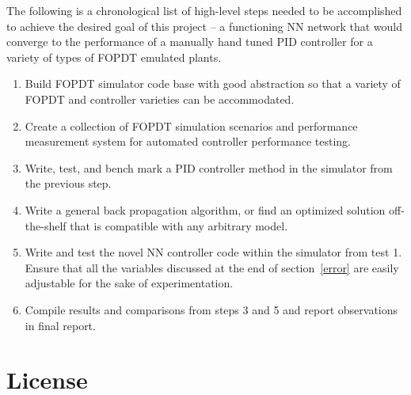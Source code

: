 \documentclass[10pt,twocolumn,letterpaper]{article}
\begin{document}
        The following is a chronological list of high-level steps needed to be accomplished to achieve the desired goal
        of this project -- a functioning NN network that would converge to the performance of a manually hand tuned PID
        controller for a variety of types of FOPDT emulated plants.

        \begin{enumerate}
            \item Build FOPDT simulator code base with good abstraction so that a variety of FOPDT and controller
                varieties can be accommodated.
            \item Create a collection of FOPDT simulation scenarios and performance measurement system for automated
                controller performance testing. 
            \item Write, test, and bench mark a PID controller method in the simulator from the previous step.
            \item Write a general back propagation algorithm, or find an optimized solution off-the-shelf that is
                compatible with any arbitrary model.
            \item Write and test the novel NN controller code within the simulator from test 1. Ensure that all the
                variables discussed at the end of section~\ref{error} are easily adjustable for the sake of
                experimentation.
            \item Compile results and comparisons from steps 3 and 5 and report observations in final report.
        \end{enumerate}

    {\small
    
    
    \nocite{*} %
    }

    \section*{License}

        \doclicenseThis
\end{document}
